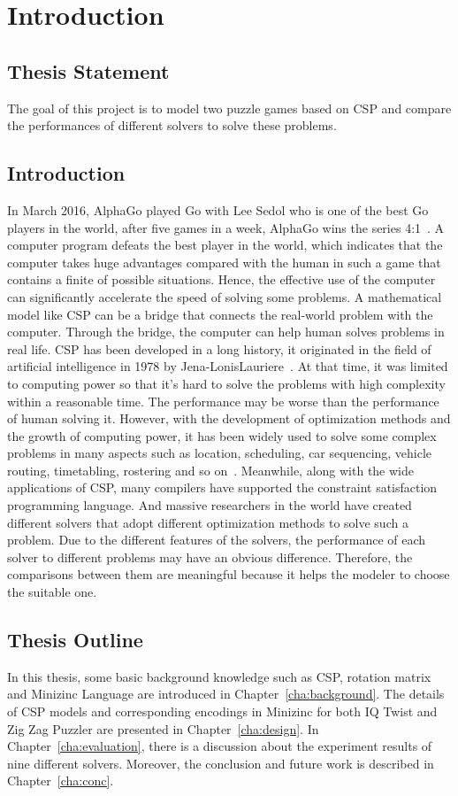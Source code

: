 \chapter{Introduction}
\label{cha:intro}
\section{Thesis Statement}
\label{sec:problemstatement}
The goal of this project is to model two puzzle games based on CSP and compare the performances of different solvers to solve these problems.
\section{Introduction}
\label{sec:introduction}
In March 2016, AlphaGo played Go with Lee Sedol who is one of the best Go players in the world, after five games in a week, AlphaGo wins the series 4:1~\cite{r26}. A computer program defeats the best player in the world, which indicates that the computer takes huge advantages compared with the human in such a game that contains a finite of possible situations. Hence, the effective use of the computer can significantly accelerate the speed of solving some problems. A mathematical model like CSP can be a bridge that connects the real-world problem with the computer. Through the bridge, the computer can help human solves problems in real life. CSP has been developed in a long history, it originated in the field of artificial intelligence in 1978 by Jena-LonisLauriere~\cite{r27}. At that time, it was limited to computing power so that it's hard to solve the problems with high complexity within a reasonable time. The performance may be worse than the performance of human solving it. However, with the development of optimization methods and the growth of computing power, it has been widely used to solve some complex problems in many aspects such as location, scheduling, car sequencing, vehicle routing, timetabling, rostering and so on~\cite{r28}. Meanwhile, along with the wide applications of CSP, many compilers have supported the constraint satisfaction programming language. And massive researchers in the world have created different solvers that adopt different optimization methods to solve such a problem. Due to the different features of the solvers, the performance of each solver to different problems may have an obvious difference. Therefore, the comparisons between them are meaningful because it helps the modeler to choose the suitable one.
\section{Thesis Outline}
\label{sec:outline}
In this thesis, some basic background knowledge such as CSP, rotation matrix and Minizinc Language are introduced in Chapter~\ref{cha:background}. The details of CSP models and corresponding encodings in Minizinc for both IQ Twist and Zig Zag Puzzler are presented in Chapter~\ref{cha:design}. In Chapter~\ref{cha:evaluation}, there is a discussion about the experiment results of nine different solvers. Moreover, the conclusion and future work is described in Chapter~\ref{cha:conc}.

